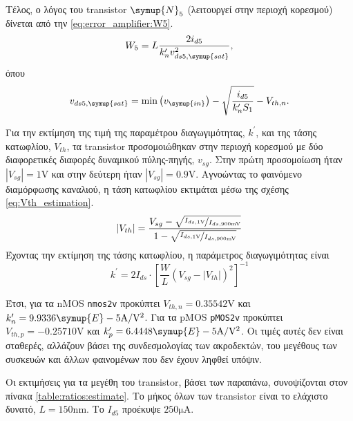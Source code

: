 Τέλος, ο λόγος του transistor $\symup{N}_5$ (λειτουργεί στην περιοχή κορεσμού) δίνεται από την \eqref{eq:error_amplifier:W5}.
\begin{equation}
	\label{eq:error_amplifier:W5}
	W_5=L\frac{2i_{d5}}{k_{n}^{\prime}v_{ds5,\symup{sat}}^{2}},
\end{equation}
όπου
\begin{equation*}
	v_{ds5,\symup{sat}}=\min{\left( v_{\symup{in}} \right)}-\sqrt{\frac{i_{d5}}{k_{n}^{\prime}S_1}}-V_{th,n}.
\end{equation*}

Για την εκτίμηση της τιμή της παραμέτρου διαγωγιμότητας, $k^{\prime}$, και της τάσης κατωφλίου, $V_{th}$, τα transistor προσομοιώθηκαν στην περιοχή κορεσμού με δύο διαφορετικές διαφορές δυναμικού πύλης-πηγής, $v_{sg}$. Στην πρώτη προσομοίωση ήταν $\left|V_{sg}\right|=1\unit{\volt}$ και στην δεύτερη ήταν $\left|V_{sg}\right|=0.9\unit{\volt}$. Αγνοώντας το φαινόμενο διαμόρφωσης καναλιού, η τάση κατωφλίου εκτιμάται μέσω της σχέσης \eqref{eq:Vth_estimation}.
\begin{equation}
	\label{eq:Vth_estimation}
	\left|V_{th}\right|=\frac{V_{sg}-\sqrt{\nicefrac{I_{ds,1\unit{V}}}{I_{ds,900\unit{\milli\volt}}}}}{1-\sqrt{\nicefrac{I_{ds,1\unit{V}}}{I_{ds,900\unit{\milli\volt}}}}}
\end{equation}
Έχοντας την εκτίμηση της τάσης κατωφλίου, η παράμετρος διαγωγιμότητας είναι
\begin{equation}
	k^{\prime}=2I_{ds}\cdot\left[ \frac{W}{L}\left(V_{sg}-\left|V_{th}\right|\right)^2 \right]^{-1}
\end{equation}

Έτσι, για τα nMOS \texttt{nmos2v} προκύπτει $V_{th,n}=0.35542\unit{\volt}$ και $k_{n}^{\prime}=9.9336\symup{E}-5 \unit{\ampere\per{\volt\squared}}$. Για τα pMOS \texttt{pMOS2v} προκύπτει $V_{th,p}=-0.25710\unit{\volt}$ και $k_{p}^{\prime}=6.4448\symup{E}-5 \unit{\ampere\per{\volt\squared}}$. Οι τιμές αυτές δεν είναι σταθερές, αλλάζουν βάσει της συνδεσμολογίας των ακροδεκτών, του μεγέθους των συσκευών και άλλων φαινομένων που δεν έχουν ληφθεί υπόψιν.\par
Οι εκτιμήσεις για τα μεγέθη του transistor, βάσει των παραπάνω, συνοψίζονται στον πίνακα \ref{table:ratios:estimate}. Το μήκος όλων των transistor είναι το ελάχιστο δυνατό, $L=150\unit{\nano\meter}$. Το $I_{d5}$ προέκυψε $250\unit{\micro\ampere}$.\par

